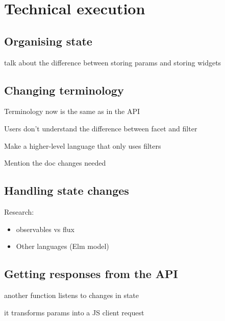 
\chapter{Technical execution} %
\label{chp:execution}

\section{Organising state} %
\label{sec:organising_state}

talk about the difference between storing params and storing widgets


\section{Changing terminology} %
\label{sec:changing_terminology}

Terminology now is the same as in the API

Users don't understand the difference between facet and filter

Make a higher-level language that only uses filters

Mention the doc changes needed


\section{Handling state changes} %
\label{sec:handling_state_changes}

Research:

\begin{itemize}
  \item observables vs flux
  \item Other languages (Elm model)\cite{csstricks-elm}
\end{itemize}


\section{Getting responses from the API} %
\label{sec:getting_responses_from_the_api}

another function listens to changes in state

it transforms params into a JS client request

